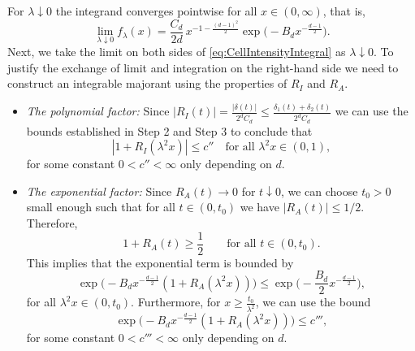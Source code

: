 \documentclass[11pt,a4paper]{article}
\theoremstyle{plain}
\theoremstyle{definition}
\theoremstyle{remark}
\begin{document}
For $\lambda\downarrow0$ the integrand converges pointwise for all $x\in(0,\infty)$, that is,
\[
	\lim_{\lambda \downarrow 0} f_\lambda(x) = \frac{C_d}{2d} \, x^{-1 - \frac{(d-1)^2}{2}} \exp\!\Big( - B_d x^{-\frac{d-1}{2}} \Big).
\]
Next, we take the limit on both sides of \eqref{eq:CellIntensityIntegral} as $\lambda\downarrow0$. To justify the exchange of limit and integration on the right-hand side we need to construct an integrable majorant using the properties of $R_I$ and $R_A$.

\begin{itemize}
	\item \textit{The polynomial factor:}
	      Since $|R_I(t)|=\frac{|\delta(t)|}{2^d C_d}\leq \frac{\delta_1(t)+\delta_2(t)}{2^d C_d}$ we can use the bounds established in Step 2 and Step 3 to conclude that
	      \[
		      |1 + R_I(\lambda^2 x)| \le c'' \quad \text{for all } \lambda^2 x \in (0,1),
	      \]
	      for some constant $0<c''<\infty$ only depending on $d$.

	\item \textit{The exponential factor:} Since $R_A(t) \to 0$ for $t\downarrow 0$, we can choose $t_0>0$ small enough such that for all $t\in (0,t_0)$ we have $|R_A(t)| \le 1/2$. Therefore,
	      \[
		      1 + R_A(t) \ge \frac{1}{2} \qquad \text{for all $t\in(0,t_0)$.}
	      \]
	      This implies that the exponential term is bounded by
	      \[
		      \exp\!\Big( - B_d x^{-\frac{d-1}{2}} (1 + R_A(\lambda^2 x)) \Big) \le \exp\!\Big( - \frac{B_d}{2} x^{-\frac{d-1}{2}} \Big),
	      \]
	      for all $\lambda^2 x \in (0,t_0)$. Furthermore, for $x\geq \frac{t_0}{\lambda^2}$, we can use the bound
	      \begin{equation*}
		      \exp\!\Big( - B_d x^{-\frac{d-1}{2}} (1 + R_A(\lambda^2 x)) \Big) \leq c''',
	      \end{equation*}
	      for some constant $0<c'''<\infty$ only depending on $d$.
\end{itemize}
\end{document}
